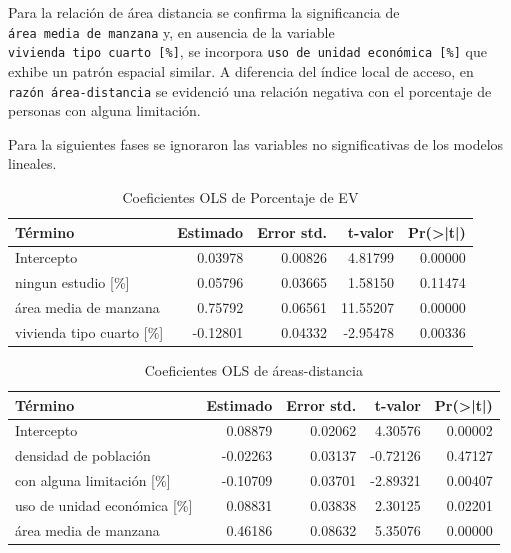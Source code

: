 \documentclass[12pt,a4paper,openany]{book}
\theoremstyle{definition}
\theoremstyle{definition}
\theoremstyle{definition}
\theoremstyle{remark}
\begin{document}
Para la relación de área distancia se confirma la significancia de
\texttt{área\ media\ de\ manzana} y, en ausencia de la variable
\texttt{vivienda\ tipo\ cuarto\ {[}\%{]}}, se incorpora
\texttt{uso\ de\ unidad\ económica\ {[}\%{]}} que exhibe un patrón
espacial similar. A diferencia del índice local de acceso, en
\texttt{razón\ área-distancia} se evidenció una relación negativa con el
porcentaje de personas con alguna limitación.

Para la siguientes fases se ignoraron las variables no significativas de
los modelos lineales.

\begin{table}[H]

\caption{\label{tab:coef-lm-ptjeAEV}Coeficientes OLS de Porcentaje de EV}
\centering
\begin{tabular}{lrrrr}
\toprule
Término & Estimado & Error std. & t-valor & Pr(>|t|)\\
\midrule
Intercepto & 0.03978 & 0.00826 & 4.81799 & 0.00000\\
ningun estudio [\%] & 0.05796 & 0.03665 & 1.58150 & 0.11474\\
área media de manzana & 0.75792 & 0.06561 & 11.55207 & 0.00000\\
vivienda tipo cuarto [\%] & -0.12801 & 0.04332 & -2.95478 & 0.00336\\
\bottomrule
\end{tabular}
\end{table}

\begin{table}[H]

\caption{\label{tab:coef-lm-areadist}Coeficientes OLS de áreas-distancia}
\centering
\begin{tabular}{lrrrr}
\toprule
Término & Estimado & Error std. & t-valor & Pr(>|t|)\\
\midrule
Intercepto & 0.08879 & 0.02062 & 4.30576 & 0.00002\\
densidad de población & -0.02263 & 0.03137 & -0.72126 & 0.47127\\
con alguna limitación [\%] & -0.10709 & 0.03701 & -2.89321 & 0.00407\\
uso de unidad económica [\%] & 0.08831 & 0.03838 & 2.30125 & 0.02201\\
área media de manzana & 0.46186 & 0.08632 & 5.35076 & 0.00000\\
\bottomrule
\end{tabular}
\end{table}
\end{document}
